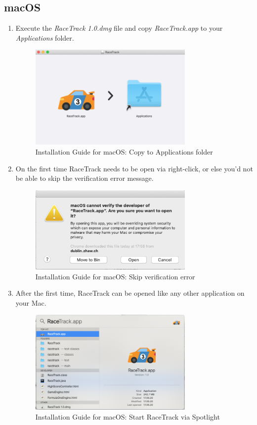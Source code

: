 	\subsection{macOS}
	\begin{enumerate}
		\item Execute the \textit{RaceTrack 1.0.dmg} file and copy \textit{RaceTrack.app} to your \textit{Applications} folder.
		\begin{figure}[H]
			\centering
			\includegraphics[width=8cm,keepaspectratio,center]{img/Implementation_Installation-Guide_macOS-1.png}
			\caption{Installation Guide for macOS: Copy to Applications folder}
		\end{figure}
		\item On the first time RaceTrack needs to be open via right-click, or else you'd not be able to skip the verification error message.
		\begin{figure}[H]
			\centering
			\includegraphics[width=8cm,keepaspectratio,center]{img/Implementation_Installation-Guide_macOS-3.png}
			\caption{Installation Guide for macOS: Skip verification error}
		\end{figure}
		\newpage
		\item After the first time, RaceTrack can be opened like any other application on your Mac.
		\begin{figure}[H]
			\centering
			\includegraphics[width=8cm,keepaspectratio,center]{img/Implementation_Installation-Guide_macOS-4.png}
			\caption{Installation Guide for macOS: Start RaceTrack via Spotlight}
		\end{figure}
	\end{enumerate}

